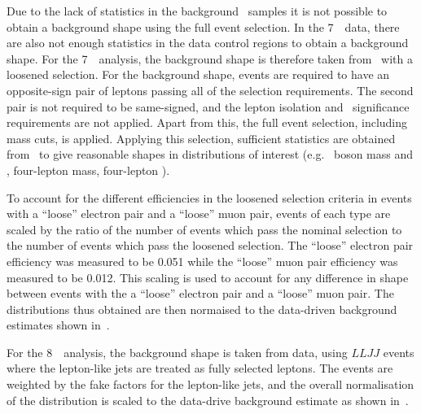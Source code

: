 Due to the lack of statistics in the background \mc\ samples it is not possible
to obtain a background shape using the full event selection. In the 7~\tev\
data, there are also not enough statistics in the data control regions to obtain
a background shape. For the 7~\tev\ analysis, the background shape is therefore
taken from \mc\ with a loosened selection. For the background shape, events are
required to have an opposite-sign pair of leptons passing all of the selection
requirements. The second pair is not required to be same-signed, and the lepton
isolation and \dzero\ significance requirements are not applied.  Apart from
this, the full event selection, including mass cuts, is applied.  Applying this
selection, sufficient statistics are obtained from \mc\ to give reasonable
shapes in distributions of interest (e.g. \Z\ boson mass and \pt, four-lepton
mass, four-lepton \pt).

To account for the different efficiencies in the loosened selection criteria in
events with a ``loose'' electron pair and a ``loose'' muon pair, events of each
type are scaled by the ratio of the number of events which pass the nominal
selection to the number of events which pass the loosened selection.  
The ``loose'' electron pair efficiency was measured to be 0.051
while the ``loose'' muon pair efficiency  was measured to be 0.012.  This
scaling is used to account for any difference in shape between events with the
a ``loose'' electron pair and a ``loose'' muon pair.  The distributions thus
obtained are then normaised to the data-driven
background estimates shown in~. 

For the 8~\tev\ analysis, the background shape is taken from data, using $LLJJ$
events where the lepton-like jets are treated as fully selected leptons.  The
events are weighted by the fake factors for the lepton-like jets, and the
overall normalisation of the distribution is scaled to the data-drive background
estimate as shown in~\tab{bg-est-final}.  

